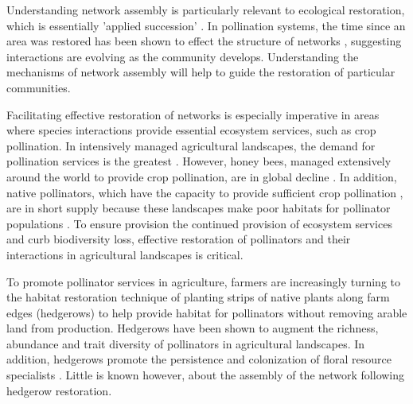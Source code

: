 \documentclass[12pt]{article}
\begin{document}
Understanding network assembly is particularly relevant to ecological
restoration, which is essentially 'applied succession'
\citep[e.g.,]{parker1997scale}. In pollination systems, the time since
an area was restored has been shown to effect the structure of
networks \citep{forup-2008-742, forup2008restoration,
  devoto2012understanding}, suggesting interactions are evolving as the
community develops. Understanding the mechanisms of network assembly
will help to guide the restoration of particular communities.

Facilitating effective restoration of networks is especially
imperative in areas where species interactions provide essential
ecosystem services, such as crop pollination. In intensively managed
agricultural landscapes, the demand for pollination services is the
greatest \citep{kremen-2008-10}. However, honey bees, managed
extensively around the world to provide crop pollination, are in
global decline \citep{neumann-2010-1, van-engelsdorp-2009-e6481}. In
addition, native pollinators, which have the capacity to provide
sufficient crop pollination \citep{kremen-2002-16816,
  winfree-2007-1105, kremen-2004-1109}, are in short supply because
these landscapes make poor habitats for pollinator populations
\citep{kremen-2002-16816}. To ensure provision the continued provision
of ecosystem services and curb biodiversity loss, effective
restoration of pollinators and their interactions in agricultural
landscapes is critical.

To promote pollinator services in agriculture, farmers are
increasingly turning to the habitat restoration technique of planting
strips of native plants along farm edges (hedgerows) to help provide
habitat for pollinators without removing arable land from
production. Hedgerows have been shown to augment the richness,
abundance and trait diversity of pollinators in agricultural
landscapes\citep{morandin-2013-829, mgonigle-2015-x, kremen-2015-602,
  ponisio2015farm}. In addition, hedgerows promote the persistence and
colonization of floral resource specialists
\citep{mgonigle-2015-x}. Little is known however, about the assembly
of the network following hedgerow restoration. 
\end{document}
